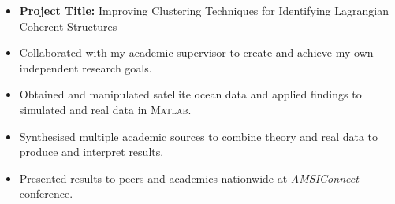 \documentclass[11pt,a4paper,academicons]{altacv}
\begin{document}
\divider

\begin{itemize}
	\item \textbf{Project Title:} Improving Clustering Techniques for Identifying Lagrangian Coherent Structures

	\item Collaborated with my academic supervisor to create and achieve my own independent research goals.

	\item Obtained and manipulated satellite ocean data and applied findings to simulated and real data in \textsc{Matlab}.

	\item Synthesised multiple academic sources to combine theory and real data to produce and interpret results.

	\item Presented results to peers and academics nationwide at \textit{AMSIConnect} conference.
\end{itemize}
\divider











\end{document}
